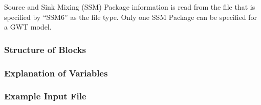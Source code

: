 Source and Sink Mixing (SSM) Package information is read from the file that is specified by ``SSM6'' as the file type.  Only one SSM Package can be specified for a GWT model. 

\vspace{5mm}
\subsubsection{Structure of Blocks}
%


\vspace{5mm}
\subsubsection{Explanation of Variables}
\begin{description}

\end{description}

\vspace{5mm}
\subsubsection{Example Input File}


